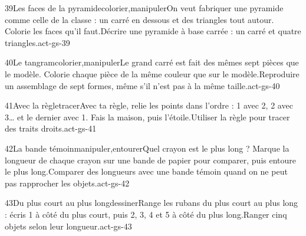 \begin{activite}{39}{Les faces de la pyramide}{colorier,manipuler}{On veut fabriquer une pyramide comme celle de la classe : un carré en dessous et des triangles tout autour. {\otBold\color{otNavy}Colorie} les faces qu’il faut.}{Décrire une pyramide à base carrée : un carré et quatre triangles.}{act-gs-39}
\end{activite}
\begin{activite}{40}{Le tangram}{colorier,manipuler}{Le grand carré est fait des mêmes sept pièces que le modèle. {\otBold\color{otNavy}Colorie} chaque pièce de la même couleur que sur le modèle.}{Reproduire un assemblage de sept formes, même s’il n’est pas à la même taille.}{act-gs-40}
\end{activite}
\begin{activite}{41}{Avec la règle}{tracer}{Avec ta {\otBold\color{otNavy}règle}, relie les points dans l’ordre : 1 avec 2, 2 avec 3… et le dernier avec 1. Fais la maison, puis l’étoile.}{Utiliser la règle pour tracer des traits droits.}{act-gs-41}
\end{activite}
\begin{activite}{42}{La bande témoin}{manipuler,entourer}{Quel crayon est le plus long ? Marque la longueur de chaque crayon sur une bande de papier pour comparer, puis {\otBold\color{otNavy}entoure} le plus long.}{Comparer des longueurs avec une bande témoin quand on ne peut pas rapprocher les objets.}{act-gs-42}
\end{activite}
\begin{activite}{43}{Du plus court au plus long}{dessiner}{Range les rubans du plus court au plus long : écris {\otBold\color{otNavy}1} à côté du plus court, puis 2, 3, 4 et {\otBold\color{otNavy}5} à côté du plus long.}{Ranger cinq objets selon leur longueur.}{act-gs-43}
\end{activite}

